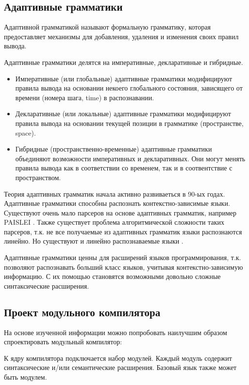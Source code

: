 \documentclass[a4paper,12pt]{article}
\begin{document}
\subsection{Адаптивные грамматики}
\label{adaptive}
Адаптивной грамматикой называют формальную грамматику, которая предоставляет
механизмы для добавления, удаления и изменения своих правил вывода.

Адаптивные грамматики делятся на императивные, декларативные и гибридные.
\begin{itemize}
  \item Императивные (или глобальные) адаптивные грамматики модифицируют правила
  вывода на основании некоего глобального состояния, зависящего от времени
  (номера шага, time) в распознавании.
  \item Декларативные (или локальные) адаптивные грамматики модифицируют правила
  вывода на основании текущей позиции в грамматике (пространстве, space).
  \item Гибридные (пространственно-временные) адаптивные грамматики объединяют
  возможности императивных и декларативных. Они могут менять правила вывода как
  в соответствии со временем, так и в соотвентствие с пространством.
\end{itemize}

Теория адаптивных грамматик начала активно развиваеться в 90-ых годах.
Адаптивные грамматики способны распознать контекстно-зависимые языки.
Существуют очень мало парсеров на основе адаптивных грамматик, например PAISLEI
\cite{paislei}. Также существует проблема алгоритмической сложности таких
парсеров, т.к. не все получаемые из адаптивных грамматик языки распознаются
линейно. Но существуют и линейно распознаваемые языки \cite{paislei}.

Адаптивные грамматики ценны для расширений языков программирования, т.к.
позволяют распознавать больший класс языков, учитывая контекстно-зависимую
информацию. С их помощью становятся возможными довольно сложные синтаксические
расширения.

\subsection{Проект модульного компилятора}
На основе изученной информации можно попробовать наилучшим образом
спроектировать модульный компилятор:

К ядру компилятора подключается набор модулей. Каждый модуль содержит
синтаксические и/или семантические расширения. Базовый язык также может быть
модулем.
\end{document}

